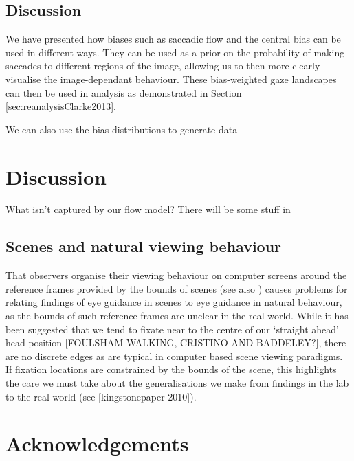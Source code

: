 \documentclass[a4paper, twocolumn, oneside, 10pt]{article}
\begin{document}
\subsection{Discussion}

We have presented how biases such as saccadic flow and the central bias can be used in different ways. They can be used as a prior on the probability of making saccades to different regions of the image, allowing us to then more clearly visualise the image-dependant behaviour. These bias-weighted gaze landscapes can then be used in analysis as demonstrated in Section \ref{sec:reanalysisClarke2013}.

We can also use the bias distributions to generate data





\section{Discussion}


What isn't captured by our flow model? There will be some stuff in \cite{macinnes2014}

\subsection{Scenes and natural viewing behaviour}
That observers organise their viewing behaviour on computer screens around the reference frames provided by the bounds of scenes (see also \cite{Stainer:2013ce}) causes problems for relating findings of eye guidance in scenes to eye guidance in natural behaviour, as the bounds of such reference frames are unclear in the real world. While it has been suggested that we tend to fixate near to the centre of our `straight ahead' head position [FOULSHAM WALKING, CRISTINO AND BADDELEY?], there are no discrete edges as are typical in computer based scene viewing paradigms. If fixation locations are constrained by the bounds of the scene, this highlights the care we must take about the generalisations we make from findings in the lab to the real world (see [kingstonepaper 2010]). 


\section*{Acknowledgements}


\appendix



\small

\end{document}
